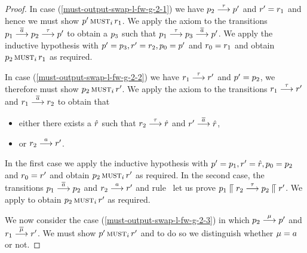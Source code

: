 \begin{proof}
    In case (\ref{must-output-swap-l-fw-g-2-1})
  we have $\server_2 \st{\tau} \server'$
  and $\client' = \client_1$ and hence we must show $\musti{\server'}{\client_1}$.
  We apply the \outputcommutativity axiom to
  the transitions $\server_1 \st{\co{\aa}} \server_2 \st{\tau} \server'$
  to obtain a $\server_3$ such that
  $\server_1 \st{\tau} \server_3 \st{\co{\aa}} \server'$.
  We apply the inductive hypothesis with
  $\serverA' = \server_3, \client' = \client_2, \server_0 = \server'$
  and $\client_0 = \client_1$ and obtain
  $\musti{\serverA_2}{\client_1}$ as required.


    In case (\ref{must-output-swap-l-fw-g-2-2})
  we have $\client_1 \st{\tau} \client'$ 
  and $\server' = \server_2$, we therefore must show $\musti{\server_2}{\client'}$.
  We apply the \outputtau axiom to
  the transitions $\client_1 \st{\tau} \client'$ and $\client_1 \st{\co{\aa}} \client_2$
  to obtain that
  \begin{itemize}
  \item either
    there exists a $\hat{\client}$ such that $\client_2 \st{\tau} \hat{\client}$ and
    $\client' \st{\co{\aa}} \hat{\client}$,
  \item or 
    $\client_2 \st{\aa} \client'$.
  \end{itemize}
  In the first case we apply the inductive hypothesis with
  $\serverA' = \serverA_1, \client' = \hat{\client}, \serverA_0 = \serverA_2$
  and $\client_0 = \client'$ and obtain $\musti{\serverA_2}{\client'}$ as required.
  In the second case,
  the transitions $\server_1 \st{\co{\aa}} \server_2$ and $\client_2
  \st{\aa} \client'$ and rule \scom\ let us prove
  $\csys{\server_1}{\client_2} \st{\tau} \csys{\server_2}{\client'}$.
  We apply  to
  obtain $\musti{\serverA_2}{\client'}$ as required.

    We now consider the case (\ref{must-output-swap-l-fw-g-2-3}) in which
  $\serverA_2 \st{\mu} \serverA'$ and $\client_1 \st{\co{\mu}} \client'$.
  We must show $\musti{\serverA'}{\client'}$ and to do so we distinguish
  whether $\mu = \aa$ or not.


\end{proof}

